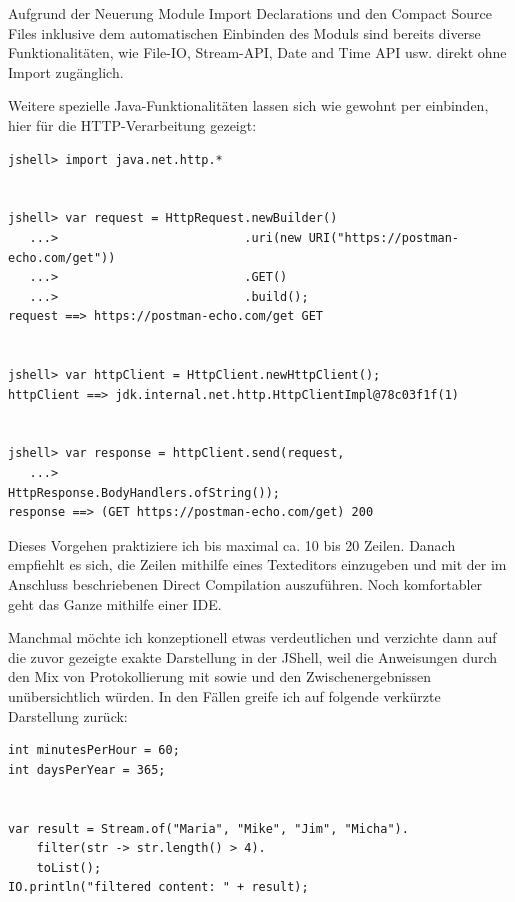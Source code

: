 Aufgrund der Neuerung Module Import Declarations und den Compact Source Files inklusive dem
automatischen Einbinden des Moduls  sind bereits diverse Funktionalitäten, wie
File-IO, Stream-API, Date and Time API usw. direkt ohne Import zugänglich.


Weitere spezielle Java-Funktionalitäten lassen sich wie gewohnt per  einbinden, hier
für die HTTP-Verarbeitung gezeigt:


\vspace{-0.75mm}
\begin{lstlisting}
jshell> import java.net.http.*


jshell> var request = HttpRequest.newBuilder()
   ...>                          .uri(new URI("https://postman-echo.com/get"))
   ...>                          .GET()
   ...>                          .build();
request ==> https://postman-echo.com/get GET


jshell> var httpClient = HttpClient.newHttpClient();
httpClient ==> jdk.internal.net.http.HttpClientImpl@78c03f1f(1)


jshell> var response = httpClient.send(request,
   ...>                                HttpResponse.BodyHandlers.ofString());
response ==> (GET https://postman-echo.com/get) 200
\end{lstlisting}
\vspace{-0.75mm}


Dieses Vorgehen praktiziere ich bis maximal ca. 10 bis 20 Zeilen. Danach empfiehlt es sich,
die Zeilen mithilfe eines Texteditors einzugeben und mit der im Anschluss beschriebenen Direct Compilation auszuführen.
Noch komfortabler geht das Ganze  mithilfe einer IDE.


Manchmal möchte ich konzeptionell etwas verdeut\-lichen und
verzichte dann auf die zuvor gezeigte exakte Darstellung in der JShell, weil
die Anweisungen durch den Mix von Protokollierung mit   sowie  und den
Zwischen\-ergebnissen unübersichtlich würden. In den Fällen greife ich auf folgende verkürzte Darstellung zurück:


\vspace{-0.75mm}
\begin{lstlisting}
int minutesPerHour = 60;
int daysPerYear = 365;


var result = Stream.of("Maria", "Mike", "Jim", "Micha").
    filter(str -> str.length() > 4).
    toList();
IO.println("filtered content: " + result);
\end{lstlisting}
\vspace{-0.75mm}


